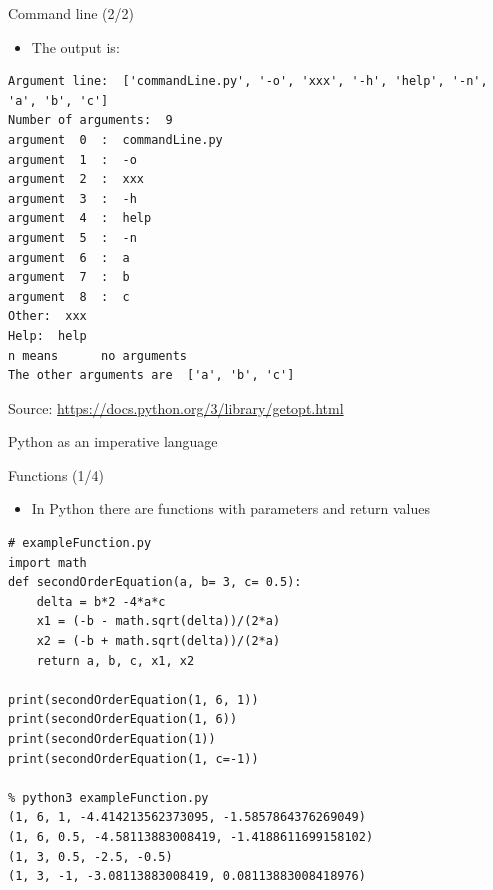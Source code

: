 \documentclass{beamer}
\begin{document}
\begin{frame}[fragile]
{\centerline{Command line (2/2)}}
\begin{itemize}
    \item The output is:
     \end{itemize}
 \begin{lstlisting}[style=myPythonStyle]
% python3 commandLine.py -o xxx -h help -n a b c
Argument line:  ['commandLine.py', '-o', 'xxx', '-h', 'help', '-n', 'a', 'b', 'c']
Number of arguments:  9
argument  0  :  commandLine.py
argument  1  :  -o
argument  2  :  xxx
argument  3  :  -h
argument  4  :  help
argument  5  :  -n
argument  6  :  a
argument  7  :  b
argument  8  :  c
Other:  xxx
Help:  help
n means 	 no arguments
The other arguments are  ['a', 'b', 'c']
\end{lstlisting}

\begin{center}
\tiny Source: \url{https://docs.python.org/3/library/getopt.html}
\end{center}

\end{frame}

\begin{frame}
{\centerline{Python as an imperative language}}
\end{frame}


\begin{frame}[fragile]
{\centerline{Functions (1/4)}}
\begin{itemize}
    \item In Python there are functions with parameters and return values
     \end{itemize}
 \begin{lstlisting}[style=myPythonStyle]
# exampleFunction.py
import math
def secondOrderEquation(a, b= 3, c= 0.5):
	delta = b*2 -4*a*c
	x1 = (-b - math.sqrt(delta))/(2*a)
	x2 = (-b + math.sqrt(delta))/(2*a)
	return a, b, c, x1, x2

print(secondOrderEquation(1, 6, 1))
print(secondOrderEquation(1, 6))
print(secondOrderEquation(1))
print(secondOrderEquation(1, c=-1))

% python3 exampleFunction.py
(1, 6, 1, -4.414213562373095, -1.5857864376269049)
(1, 6, 0.5, -4.58113883008419, -1.4188611699158102)
(1, 3, 0.5, -2.5, -0.5)
(1, 3, -1, -3.08113883008419, 0.08113883008418976)

\end{lstlisting}

\end{frame}
\end{document}
